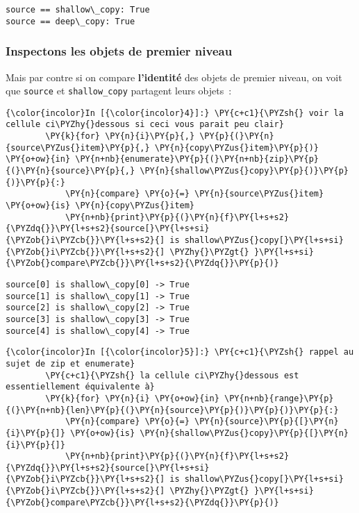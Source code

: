     \begin{Verbatim}[commandchars=\\\{\}]
source == shallow\_copy: True
source == deep\_copy: True

    \end{Verbatim}

    \hypertarget{inspectons-les-objets-de-premier-niveau}{%
\subsubsection{Inspectons les objets de premier
niveau}\label{inspectons-les-objets-de-premier-niveau}}

    Mais par contre si on compare \textbf{l'identité} des objets de premier
niveau, on voit que \texttt{source} et \texttt{shallow\_copy} partagent
leurs objets~:

    \begin{Verbatim}[commandchars=\\\{\}]
{\color{incolor}In [{\color{incolor}4}]:} \PY{c+c1}{\PYZsh{} voir la cellule ci\PYZhy{}dessous si ceci vous parait peu clair}
        \PY{k}{for} \PY{n}{i}\PY{p}{,} \PY{p}{(}\PY{n}{source\PYZus{}item}\PY{p}{,} \PY{n}{copy\PYZus{}item}\PY{p}{)} \PY{o+ow}{in} \PY{n+nb}{enumerate}\PY{p}{(}\PY{n+nb}{zip}\PY{p}{(}\PY{n}{source}\PY{p}{,} \PY{n}{shallow\PYZus{}copy}\PY{p}{)}\PY{p}{)}\PY{p}{:}
            \PY{n}{compare} \PY{o}{=} \PY{n}{source\PYZus{}item} \PY{o+ow}{is} \PY{n}{copy\PYZus{}item}
            \PY{n+nb}{print}\PY{p}{(}\PY{n}{f}\PY{l+s+s2}{\PYZdq{}}\PY{l+s+s2}{source[}\PY{l+s+si}{\PYZob{}i\PYZcb{}}\PY{l+s+s2}{] is shallow\PYZus{}copy[}\PY{l+s+si}{\PYZob{}i\PYZcb{}}\PY{l+s+s2}{] \PYZhy{}\PYZgt{} }\PY{l+s+si}{\PYZob{}compare\PYZcb{}}\PY{l+s+s2}{\PYZdq{}}\PY{p}{)}
\end{Verbatim}


    \begin{Verbatim}[commandchars=\\\{\}]
source[0] is shallow\_copy[0] -> True
source[1] is shallow\_copy[1] -> True
source[2] is shallow\_copy[2] -> True
source[3] is shallow\_copy[3] -> True
source[4] is shallow\_copy[4] -> True

    \end{Verbatim}

    \begin{Verbatim}[commandchars=\\\{\}]
{\color{incolor}In [{\color{incolor}5}]:} \PY{c+c1}{\PYZsh{} rappel au sujet de zip et enumerate}
        \PY{c+c1}{\PYZsh{} la cellule ci\PYZhy{}dessous est essentiellement équivalente à}
        \PY{k}{for} \PY{n}{i} \PY{o+ow}{in} \PY{n+nb}{range}\PY{p}{(}\PY{n+nb}{len}\PY{p}{(}\PY{n}{source}\PY{p}{)}\PY{p}{)}\PY{p}{:}
            \PY{n}{compare} \PY{o}{=} \PY{n}{source}\PY{p}{[}\PY{n}{i}\PY{p}{]} \PY{o+ow}{is} \PY{n}{shallow\PYZus{}copy}\PY{p}{[}\PY{n}{i}\PY{p}{]}
            \PY{n+nb}{print}\PY{p}{(}\PY{n}{f}\PY{l+s+s2}{\PYZdq{}}\PY{l+s+s2}{source[}\PY{l+s+si}{\PYZob{}i\PYZcb{}}\PY{l+s+s2}{] is shallow\PYZus{}copy[}\PY{l+s+si}{\PYZob{}i\PYZcb{}}\PY{l+s+s2}{] \PYZhy{}\PYZgt{} }\PY{l+s+si}{\PYZob{}compare\PYZcb{}}\PY{l+s+s2}{\PYZdq{}}\PY{p}{)}
\end{Verbatim}


